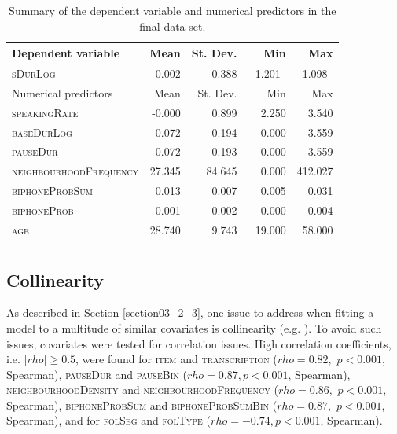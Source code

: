 \begin{table}\fontsize{10}{11}
\caption{Summary of the dependent variable and numerical predictors in the final data set.}
\label{tab:4.3}
\centering
\begin{tabular}{lrrrr} 
\lsptoprule
Dependent variable     & Mean   & St. Dev. & Min        & Max      \\ 
\midrule
\textsc{sDurLog}                & 0.002  & 0.388    & -
  1.201~ & 1.098~   \\ 
\midrule
Numerical predictors   & Mean   & St. Dev. & Min        & Max      \\ 
\midrule
\textsc{speakingRate}           & -0.000 & 0.899    & 2.250      & 3.540    \\
\textsc{baseDurLog}             & 0.072  & 0.194    & 0.000      & 3.559    \\
\textsc{pauseDur}               & 0.072  & 0.193    & 0.000      & 3.559    \\
\textsc{neighbourhoodFrequency} & 27.345 & 84.645   & 0.000      & 412.027  \\
\textsc{biphoneProbSum}         & 0.013  & 0.007    & 0.005      & 0.031    \\
\textsc{biphoneProb}            & 0.001  & 0.002    & 0.000      & 0.004    \\
\textsc{age}                    & 28.740 & 9.743    & 19.000     & 58.000   \\
\lspbottomrule
\end{tabular}
\end{table}


\subsection{Collinearity}\label{section04_2_3}

As described in Section \ref{section03_2_3}, one issue to address when fitting a model to a multitude of similar covariates is collinearity (e.g. \cite{Tomaschek2018collin}). To avoid such issues, covariates were tested for correlation issues. High correlation coefficients, i.e. $|rho|≥0.5$, were found for \textsc{item} and \textsc{transcription} ($rho=0.82,$ $p<0.001$, Spearman), \textsc{pauseDur} and \textsc{pauseBin} ($rho=0.87,p<0.001$, Spearman), \textsc{neighbourhoodDensity} and \textsc{neighbourhoodFrequency} ($rho=0.86,$ $p<0.001$, Spearman), \textsc{biphoneProbSum} and \textsc{biphoneProbSumBin} ($rho=0.87,$ $p<0.001$, Spearman), and for \textsc{folSeg} and \textsc{folType} ($rho=-0.74,p<0.001$, Spearman).    

